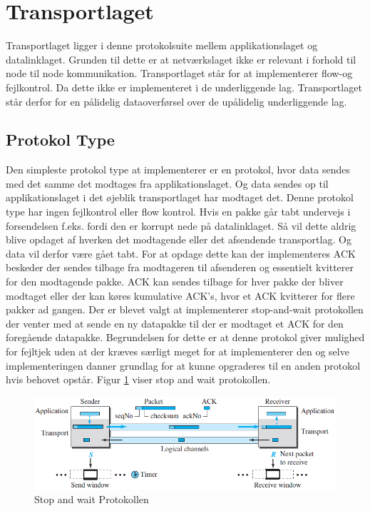 \section{Transportlaget}
Transportlaget ligger i denne protokolsuite mellem applikationslaget og datalinklaget. Grunden til dette er at netværkslaget ikke er relevant i forhold til node til node kommunikation. Transportlaget står for at implementerer flow-og fejlkontrol. Da dette ikke er implementeret i de underliggende lag. Transportlaget står derfor for en pålidelig dataoverførsel over de upålidelig underliggende lag.

\subsection{Protokol Type}
Den simpleste protokol type at implementerer er en protokol, hvor data sendes med det samme det modtages fra applikationslaget. Og data sendes op til applikationslaget i det øjeblik transportlaget har modtaget det. Denne protokol type har ingen fejlkontrol eller flow kontrol. Hvis en pakke går tabt undervejs i forsendelsen f.eks. fordi den er korrupt nede på datalinklaget. Så vil dette aldrig blive opdaget af hverken det modtagende eller det afsendende transportlag. Og data vil derfor være gået tabt. For at opdage dette kan der implementeres ACK beskeder der sendes tilbage fra modtageren til afsenderen og essentielt kvitterer for den modtagende pakke. ACK kan sendes tilbage for hver pakke der bliver modtaget eller der kan køres kumulative ACK's, hvor et ACK kvitterer for flere pakker ad gangen. Der er blevet valgt at implementerer stop-and-wait protokollen der venter med at sende en ny datapakke til der er modtaget et ACK for den foregående datapakke. Begrundelsen for dette er  at denne protokol giver mulighed for fejltjek uden at der kræves særligt meget for at implementerer den og selve implementeringen danner grundlag for at kunne opgraderes til en anden protokol hvis behovet opstår. Figur \ref{StopAndWait} viser stop and wait protokollen.
\begin{figure}[h]
\centering
\includegraphics[scale=0.75]{Billeder/StopAndWait.png}
\caption{Stop and wait Protokollen
\label{StopAndWait}}
\end{figure}

